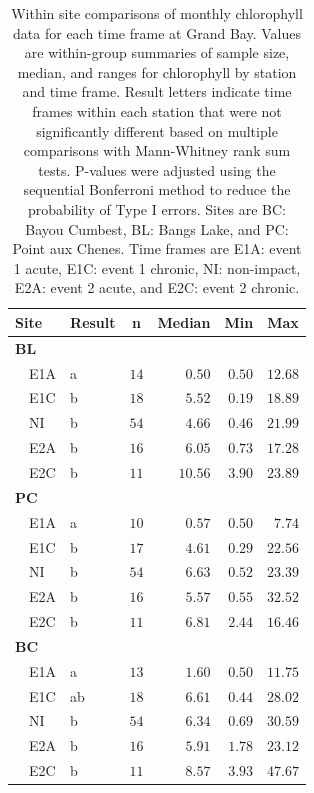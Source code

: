 \documentclass[letterpaper,12pt]{article}\usepackage[]{graphicx}\usepackage[]{color}
\begin{document}
\begin{table}[!tbp]
\caption{Within site comparisons  of monthly chlorophyll data for each time frame at Grand Bay.  Values are within-group summaries of sample size, median, and ranges for chlorophyll by station and time frame.  Result letters indicate time frames within each station that were not significantly different based on multiple comparisons with Mann-Whitney rank sum tests.  P-values were adjusted using the sequential Bonferroni method to reduce the probability of Type I errors. Sites are BC: Bayou Cumbest, BL: Bangs Lake, and PC: Point aux Chenes.  Time frames are E1A: event 1 acute, E1C: event 1 chronic, NI: non-impact, E2A: event 2 acute, and E2C: event 2 chronic.\label{tab:chltab}} 
\begin{center}
\begin{tabular}{llrrrr}
\hline\hline
\multicolumn{1}{l}{Site}&\multicolumn{1}{c}{Result}&\multicolumn{1}{c}{n}&\multicolumn{1}{c}{Median}&\multicolumn{1}{c}{Min}&\multicolumn{1}{c}{Max}\tabularnewline
\hline
{\bfseries BL}&&&&&\tabularnewline
~~E1A&a&$14$&$ 0.50$&$0.50$&$12.68$\tabularnewline
~~E1C&b&$18$&$ 5.52$&$0.19$&$18.89$\tabularnewline
~~NI&b&$54$&$ 4.66$&$0.46$&$21.99$\tabularnewline
~~E2A&b&$16$&$ 6.05$&$0.73$&$17.28$\tabularnewline
~~E2C&b&$11$&$10.56$&$3.90$&$23.89$\tabularnewline
\hline
{\bfseries PC}&&&&&\tabularnewline
~~E1A&a&$10$&$ 0.57$&$0.50$&$ 7.74$\tabularnewline
~~E1C&b&$17$&$ 4.61$&$0.29$&$22.56$\tabularnewline
~~NI&b&$54$&$ 6.63$&$0.52$&$23.39$\tabularnewline
~~E2A&b&$16$&$ 5.57$&$0.55$&$32.52$\tabularnewline
~~E2C&b&$11$&$ 6.81$&$2.44$&$16.46$\tabularnewline
\hline
{\bfseries BC}&&&&&\tabularnewline
~~E1A&a&$13$&$ 1.60$&$0.50$&$11.75$\tabularnewline
~~E1C&ab&$18$&$ 6.61$&$0.44$&$28.02$\tabularnewline
~~NI&b&$54$&$ 6.34$&$0.69$&$30.59$\tabularnewline
~~E2A&b&$16$&$ 5.91$&$1.78$&$23.12$\tabularnewline
~~E2C&b&$11$&$ 8.57$&$3.93$&$47.67$\tabularnewline
\hline
\end{tabular}\end{center}

\end{table}

\clearpage
\end{document}
